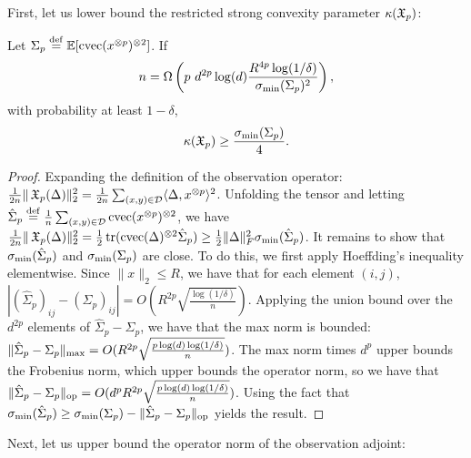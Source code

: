
First, let us lower bound the restricted strong convexity parameter $\kappa(\operatorname{\mathfrak{X}}_p)$:

\begin{lemma}
\label{lem:lowRankLower}
Let $\Sigma_p \stackrel{\rm def}{=} \operatorname{\mathbb{E}}[\operatorname{cvec}(x^{\otimes p})^{\otimes 2}]$.
If $$n = \Omega \left( p ~ d^{2p} \log(d) \frac{R^{4p} \log(1/\delta)}{\sigma_\text{\rm min}(\Sigma_p)^2} \right),$$
with probability at least $1-\delta$,
$$\kappa(\operatorname{\mathfrak{X}}_p) \ge \frac{\sigma_\text{\rm min}(\Sigma_p)}{4}.$$
\end{lemma}
\begin{proof}
Expanding the definition of the observation operator:
$\frac{1}{2n} \|\operatorname{\mathfrak{X}}_p(\Delta)\|_2^2
= \frac{1}{2n} \sum_{(x,y) \in \mathcal{D}} \langle \Delta, x^{\otimes p} \rangle^2$.
Unfolding the tensor and letting $\hat\Sigma_p \stackrel{\rm def}{=} \frac{1}{n} \sum_{(x,y) \in \mathcal{D}} \operatorname{cvec}(x^{\otimes p})^{\otimes 2}$,
we have 
$\frac{1}{2n} \|\operatorname{\mathfrak{X}}_p(\Delta)\|_2^2
= \frac{1}{2} \operatorname{tr}(\operatorname{cvec}(\Delta)^{\otimes 2} \hat\Sigma_p)
\ge \frac{1}{2} \|\Delta\|_F^2 \sigma_\text{\rm min}(\hat\Sigma_p)$.
It remains to show that $\sigma_\text{\rm min}(\hat\Sigma_p)$ and $\sigma_\text{\rm min}(\Sigma_p)$ are close.
To do this, we first apply Hoeffding's inequality elementwise.
Since $\|x\|_2 \le R$, we have that for each element $(i,j)$,
$|(\hat\Sigma_p)_{ij} - (\Sigma_p)_{ij}| = O(R^{2p}\sqrt{\frac{\log (1/\delta)}{n}})$.
Applying the union bound over the $d^{2p}$ elements of $\hat\Sigma_p - \Sigma_p$,
we have that the max norm is bounded:
$\|\hat\Sigma_p - \Sigma_p\|_\text{\rm max} = O(R^{2p} \sqrt{\frac{p \log(d) \log (1/\delta)}{n}})$.
The max norm times $d^p$ upper bounds the Frobenius norm, which upper bounds the operator norm, so we have that
$\|\hat\Sigma_p - \Sigma_p\|_\text{\rm op} = O(d^p R^{2p} \sqrt{\frac{p \log(d) \log (1/\delta)}{n}})$.
Using the fact that $\sigma_\text{\rm min}(\hat\Sigma_p) \ge \sigma_\text{\rm min}(\Sigma_p) - \|\hat\Sigma_p - \Sigma_p\|_\text{\rm op}$
yields the result.
\end{proof}

Next, let us upper bound the operator norm of the observation adjoint:


